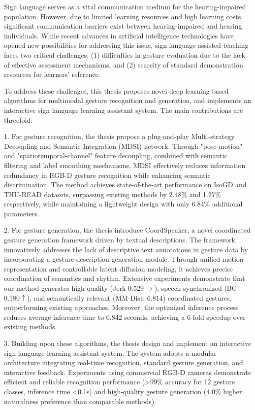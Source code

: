 \begin{abstract*}
Sign language serves as a vital communication medium for the hearing-impaired population. However, due to limited learning resources and high learning costs, significant communication barriers exist between hearing-impaired and hearing individuals. While recent advances in artificial intelligence technologies have opened new possibilities for addressing this issue, sign language assisted teaching faces two critical challenges: (1) difficulties in gesture evaluation due to the lack of effective assessment mechanisms, and (2) scarcity of standard demonstration resources for learners' reference.

To address these challenges, this thesis proposes novel deep learning-based algorithms for multimodal gesture recognition and generation, and implements an interactive sign language learning assistant system. The main contributions are threefold:

1. For gesture recognition, the thesis propose a plug-and-play Multi-strategy Decoupling and Semantic Integration (MDSI) network. Through "pose-motion" and "spatiotemporal-channel" feature decoupling, combined with semantic filtering and label smoothing mechanisms, MDSI effectively reduces information redundancy in RGB-D gesture recognition while enhancing semantic discrimination. The method achieves state-of-the-art performance on IsoGD and THU-READ datasets, surpassing existing methods by 2.48\% and 1.27\% respectively, while maintaining a lightweight design with only 6.84\% additional parameters.

2. For gesture generation, the thesis introduce CoordSpeaker, a novel coordinated gesture generation framework driven by textual descriptions. The framework innovatively addresses the lack of descriptive text annotations in gesture data by incorporating a gesture description generation module. Through unified motion representation and controllable latent diffusion modeling, it achieves precise coordination of semantics and rhythm. Extensive experiments demonstrate that our method generates high-quality (Jerk $0.529\rightarrow$), speech-synchronized (BC $0.180\uparrow$), and semantically relevant (MM-Dist: $6.814$) coordinated gestures, outperforming existing approaches. Moreover, the optimized inference process reduces average inference time to 0.842 seconds, achieving a 6-fold speedup over existing methods.

3. Building upon these algorithms, the thesis design and implement an interactive sign language learning assistant system. The system adopts a modular architecture integrating real-time recognition, standard gesture generation, and interactive feedback. Experiments using commercial RGB-D cameras demonstrate efficient and reliable recognition performance (>99\% accuracy for 12 gesture classes, inference time <0.1s) and high-quality gesture generation (4.0\% higher naturalness preference than comparable methods). 


\end{abstract*}
